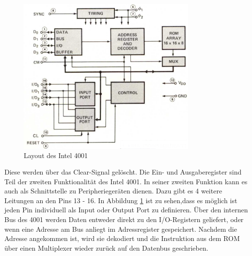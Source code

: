  \begin{figure}[h]
 	\centering
  	\includegraphics[width=0.8\textwidth]{figures/layout_4001.png}
  	\caption{Layout des Intel 4001}
  	\label{fig:layout_4001}
 \end{figure}
Diese werden über das Clear-Signal gelöscht. Die Ein- und Ausgaberegister sind Teil der zweiten Funktionalität des Intel 4001. In seiner zweiten Funktion kann es auch als Schnittstelle zu Peripheriegeräten dienen. Dazu gibt es 4 weitere Leitungen an den Pins 13 - 16. In Abbildung \ref{fig:layout_4001} ist zu sehen,dass es möglich ist jeden Pin individuell als Input oder Output Port zu definieren. Über den internen Bus des 4001 werden Daten entweder direkt zu den I/O-Registern geliefert, oder wenn eine Adresse am Bus anliegt im Adressregister gespeichert. Nachdem die Adresse angekommen ist, wird sie dekodiert und die Instruktion aus dem ROM über einen Multiplexer wieder zurück auf den Datenbus geschrieben.

